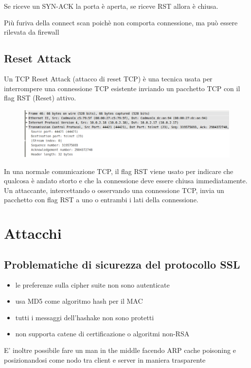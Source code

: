 \documentclass{report}
\begin{document}
\noindent Se riceve un SYN-ACK la porta è aperta, se riceve RST allora è chiusa.

\noindent Più furiva della connect scan poichè non comporta connessione, ma può essere rilevata da firewall 


\section{Reset Attack}
Un TCP Reset Attack (attacco di reset TCP) è una tecnica usata per interrompere una connessione TCP esistente inviando un pacchetto TCP con il flag RST (Reset) attivo.
\begin{figure}[H]
    \centering
    \includegraphics[width=1\linewidth]{images/reset.png}
\end{figure}
\noindent In una normale comunicazione TCP, il flag RST viene usato per indicare che qualcosa è andato storto e che la connessione deve essere chiusa immediatamente.
Un attaccante, intercettando o osservando una connessione TCP, invia un pacchetto con flag RST a uno o entrambi i lati della connessione.




\chapter{Attacchi}

\section{Problematiche di sicurezza del protocollo SSL}
\begin{itemize}
    \item le preferenze sulla cipher suite non sono autenticate
    \item usa MD5 come algoritmo hash per il MAC
    \item tutti i messaggi dell'hashake non sono protetti
    \item non supporta catene di certificazione o algoritmi non-RSA
\end{itemize}

E' inoltre possibile fare un man in the middle facendo ARP cache poisoning e posizionandosi come nodo
tra client e server in maniera trasparente
\end{document}
